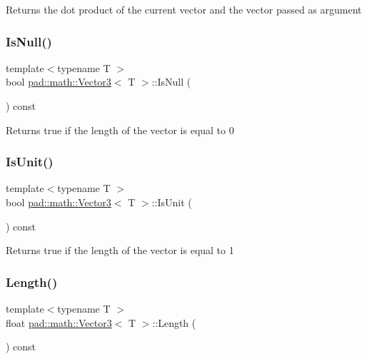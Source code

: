 Returns the dot product of the current vector and the vector passed as argument \mbox{\label{structpad_1_1math_1_1_vector3_a47a83130cf6e4210a5a3d7f8ac7bb70a}} 
\subsubsection{\texorpdfstring{Is\+Null()}{IsNull()}}
{\footnotesize\ttfamily template$<$typename T $>$ \\
bool \mbox{\hyperlink{structpad_1_1math_1_1_vector3}{pad\+::math\+::\+Vector3}}$<$ T $>$\+::Is\+Null (\begin{DoxyParamCaption}{ }\end{DoxyParamCaption}) const}

Returns true if the length of the vector is equal to 0 \mbox{\label{structpad_1_1math_1_1_vector3_ab8816c85165ed684cb521f3647dff935}} 
\subsubsection{\texorpdfstring{Is\+Unit()}{IsUnit()}}
{\footnotesize\ttfamily template$<$typename T $>$ \\
bool \mbox{\hyperlink{structpad_1_1math_1_1_vector3}{pad\+::math\+::\+Vector3}}$<$ T $>$\+::Is\+Unit (\begin{DoxyParamCaption}{ }\end{DoxyParamCaption}) const}

Returns true if the length of the vector is equal to 1 \mbox{\label{structpad_1_1math_1_1_vector3_a9461a10c56017a46fe943a89d6390d38}} 
\subsubsection{\texorpdfstring{Length()}{Length()}}
{\footnotesize\ttfamily template$<$typename T $>$ \\
float \mbox{\hyperlink{structpad_1_1math_1_1_vector3}{pad\+::math\+::\+Vector3}}$<$ T $>$\+::Length (\begin{DoxyParamCaption}{ }\end{DoxyParamCaption}) const}

